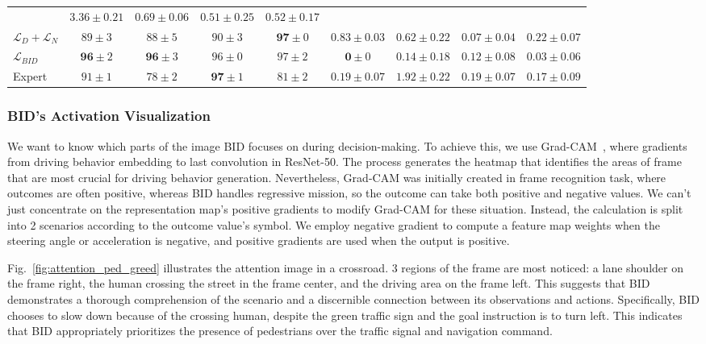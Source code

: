 \documentclass[preprint,12pt]{elsarticle}
\begin{document}
\begin{table}
{\begin{tabular}{lcccccccc}
		& $3.36\pm0.21$ & $0.69\pm0.06$ & $0.51\pm0.25$   & $0.52\pm0.17$    \\
		$\mathcal{L}_D+\mathcal{L}_N$
		& $89 \pm 3$ & $88 \pm 5$  & $90 \pm 3$ & $\mathbf{97} \pm 0$  
		& $0.83 \pm 0.03$ & $0.62 \pm 0.22$ & $\mathbf{0.07} \pm 0.04$   & $0.22 \pm 0.07$    \\
		$\mathcal{L}_{BID}$
		& $\mathbf{96} \pm 2$ & $\mathbf{96} \pm 3$ & $96 \pm 0$ & $97 \pm 2$ 
		&  $\mathbf{0} \pm 0$ & $\mathbf{0.14} \pm 0.18$  & $0.12 \pm 0.08$   & $\mathbf{0.03} \pm 0.06$  \\
		Expert
		& $91 \pm 1$ & $78 \pm 2$ & $\mathbf{97} \pm 1$ & $81 \pm 2$ 
		& $0.19 \pm 0.07$ & $1.92 \pm 0.22$  & $0.19 \pm 0.07$  & $0.17 \pm 0.09$   \\
		\hline
	\end{tabular}
	}
	\vspace{-1ex}
	\vspace{-2.5ex}
	\label{table:infraction}
\end{table}


\subsubsection{BID's Activation Visualization}
\label{sec:Visualization}
\hspace{1pc}We want to know which parts of the image BID focuses on during decision-making. 
To achieve this, we use Grad-CAM~\cite{Selvaraju:2017}, where gradients from driving behavior embedding to last convolution in ResNet-50. 
The process generates the heatmap that identifies the areas of frame that are most crucial for driving behavior generation. 
Nevertheless, Grad-CAM was initially created in frame recognition task, where outcomes are often positive, whereas BID handles regressive mission, so the outcome can take both positive and negative values.
We can't just concentrate on the representation map's positive gradients to modify Grad-CAM for these situation.
Instead, the calculation is split into 2 scenarios according to the outcome value's symbol. 
We employ negative gradient to compute a feature map weights when the steering angle or acceleration is negative, and positive gradients are used when the output is positive.



Fig.~\ref{fig:attention_ped_greed} illustrates the attention image in a crossroad. 
3 regions of the frame are most noticed: a lane shoulder on the frame right, the human crossing the street in the frame center, and the driving area on the frame left. 
This suggests that BID demonstrates a thorough comprehension of the scenario and a discernible connection between its observations and actions. 
Specifically, BID chooses to slow down because of the crossing human, despite the green traffic sign and the goal instruction is to turn left. 
This indicates that BID appropriately prioritizes the presence of pedestrians over the traffic signal and navigation command.
\end{document}
